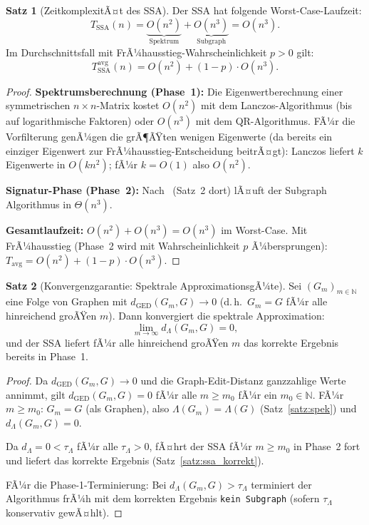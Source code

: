 ﻿\documentclass[a4paper,12pt]{article}
\theoremstyle{definition}
\newtheorem{satz}{Satz}
\begin{document}
\begin{satz}[ZeitkomplexitÃ¤t des SSA]
\label{satz:ssa_kompl}
    Der SSA hat folgende Worst-Case-Laufzeit:
    \[
    T_{\mathrm{SSA}}(n) = \underbrace{O(n^2)}_{\text{Spektrum}} + \underbrace{O(n^3)}_{\text{Subgraph}} = O(n^3).
    \]
    Im Durchschnittsfall mit FrÃ¼hausstieg-Wahrscheinlichkeit $p > 0$ gilt:
    \[
    T_{\mathrm{SSA}}^{\mathrm{avg}}(n) = O(n^2) + (1-p)\cdot O(n^3).
    \]
\end{satz}

\begin{proof}
    \textbf{Spektrumsberechnung (Phase~1):}
    Die Eigenwertberechnung einer symmetrischen $n\times n$-Matrix kostet $O(n^2)$ mit dem
    Lanczos-Algorithmus (bis auf logarithmische Faktoren) oder $O(n^3)$ mit dem
    QR-Algorithmus. FÃ¼r die Vorfilterung genÃ¼gen die grÃ¶ÃŸten wenigen Eigenwerte
    (da bereits ein einziger Eigenwert zur FrÃ¼hausstieg-Entscheidung beitrÃ¤gt):
    Lanczos liefert $k$ Eigenwerte in $O(kn^2)$; fÃ¼r $k = O(1)$ also $O(n^2)$.

    \textbf{Signatur-Phase (Phase~2):}
    Nach~\cite{epp2026subgraph} (Satz~2 dort) lÃ¤uft der Subgraph Algorithmus in $\Theta(n^3)$.

    \textbf{Gesamtlaufzeit:}
    $O(n^2) + O(n^3) = O(n^3)$ im Worst-Case.
    Mit FrÃ¼hausstieg (Phase~2 wird mit Wahrscheinlichkeit $p$ Ã¼bersprungen):
    $T_{\mathrm{avg}} = O(n^2) + (1-p)\cdot O(n^3)$. \qedhere
\end{proof}

\begin{satz}[Konvergenzgarantie: Spektrale ApproximationsgÃ¼te]
\label{satz:konvgaran}
    Sei $(G_m)_{m\in\mathbb{N}}$ eine Folge von Graphen mit
    $d_{\mathrm{GED}}(G_m, G) \to 0$ (d.\,h.\ $G_m = G$ fÃ¼r alle hinreichend groÃŸen $m$).
    Dann konvergiert die spektrale Approximation:
    \[
    \lim_{m\to\infty} d_\Lambda(G_m, G) = 0,
    \]
    und der SSA liefert fÃ¼r alle hinreichend groÃŸen $m$ das korrekte Ergebnis bereits in
    Phase~1.
\end{satz}

\begin{proof}
    Da $d_{\mathrm{GED}}(G_m, G) \to 0$ und die Graph-Edit-Distanz ganzzahlige Werte annimmt,
    gilt $d_{\mathrm{GED}}(G_m, G) = 0$ fÃ¼r alle $m \geq m_0$ fÃ¼r ein $m_0 \in \mathbb{N}$.
    FÃ¼r $m \geq m_0$: $G_m = G$ (als Graphen), also $\Lambda(G_m) = \Lambda(G)$
    (Satz~\ref{satz:spek}) und $d_\Lambda(G_m, G) = 0$.

    Da $d_\Lambda = 0 < \tau_\Lambda$ fÃ¼r alle $\tau_\Lambda > 0$, fÃ¤hrt der SSA fÃ¼r
    $m \geq m_0$ in Phase~2 fort und liefert das korrekte Ergebnis (Satz~\ref{satz:ssa_korrekt}).

    FÃ¼r die Phase-1-Terminierung: Bei $d_\Lambda(G_m, G) > \tau_\Lambda$ terminiert der
    Algorithmus frÃ¼h mit dem korrekten Ergebnis \texttt{kein Subgraph}
    (sofern $\tau_\Lambda$ konservativ gewÃ¤hlt). \qedhere
\end{proof}
\end{document}

